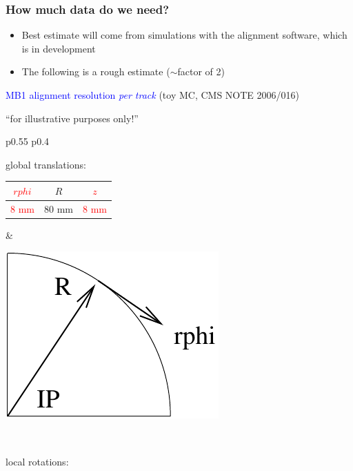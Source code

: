 \documentclass[compress]{beamer}
\begin{document}
\begin{frame}
\frametitle{How much data do we need?}

\vspace{-0.5 cm}
\begin{itemize}
\item Best estimate will come from simulations with the alignment software, which is in development
\item The following is a rough estimate ($\sim$factor of 2)
\end{itemize}

\vfill

\textcolor{blue}{MB1 alignment resolution {\it per track}} {\small (toy MC, CMS NOTE 2006/016)}

\hfill {\small ``for illustrative purposes only!''}

\begin{tabular}{p{0.55\linewidth} p{0.4\linewidth}}
  \begin{minipage}{\linewidth}
    \vspace{0.25 cm}
    global translations:

    \begin{center}
      \begin{tabular}{c c c}
	\textcolor{red}{$rphi$} & $R$ & \textcolor{red}{$z$} \\\hline
	\textcolor{red}{8 mm} & 80 mm & \textcolor{red}{8 mm}
      \end{tabular}
    \end{center}
  \end{minipage} &
  \begin{minipage}{\linewidth}
    \includegraphics[height=1.7 cm]{global_coordinates}
  \end{minipage} \\
  \begin{minipage}{\linewidth}
    \vspace{0.25 cm}
    local rotations:


\end{minipage}
\end{tabular}
\end{frame}
\end{document}
